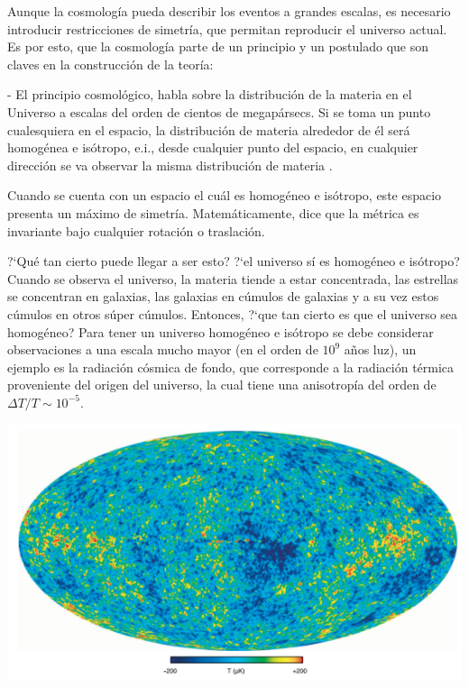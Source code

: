 Aunque la cosmología pueda describir los eventos a grandes escalas, es necesario introducir restricciones de simetría, que permitan reproducir el universo actual. Es por esto, que la cosmología parte de un principio y un postulado que son claves en la construcción de la teoría:  

- El principio cosmológico, habla sobre la distribución de la materia en el Universo a escalas del orden de cientos de megapársecs. Si se toma un punto cualesquiera en el espacio, la distribución de materia alrededor de él será homogénea e isótropo, e.i., desde cualquier punto del espacio, en cualquier dirección se va observar la misma distribución de materia 
\cite{janssen2013}. %


Cuando se cuenta con un espacio el cuál es homogéneo e isótropo, este espacio presenta un máximo de simetría.  Matemáticamente, dice que la métrica es invariante bajo cualquier rotación o traslación. 

?`Qué tan cierto puede llegar a ser esto? ?`el universo sí es homogéneo e isótropo? Cuando se observa el universo, la materia tiende a estar concentrada, las estrellas se concentran en galaxias, las galaxias en cúmulos de galaxias y a su vez estos cúmulos en otros súper cúmulos. Entonces, ?`que tan cierto es que el universo sea homogéneo? Para tener un universo homogéneo e isótropo se debe considerar observaciones a una escala mucho mayor (en el orden de $10^{9}$ años luz), un ejemplo es la radiación cósmica de fondo, que corresponde a la radiación térmica proveniente del origen del universo, la cual tiene una anisotropía del orden de $\Delta T /T \sim 10^{-5}$\cite{bond1987}. 

\begin{center}
\includegraphics[scale=.5]{./figures/2_theoretical_framework/backgraundCosmicRadiation.png}
\label{fig:radiación_cosmica_de_fondo}
\end{center}

